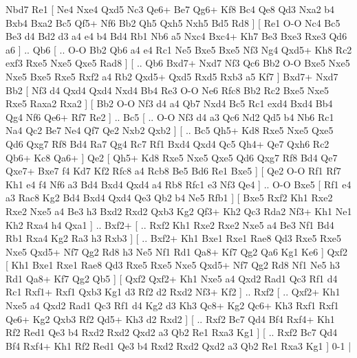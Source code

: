 Nbd7    Re1 [  Ne4 Nxe4  Qxd5 Nc3  Qe6+ Be7  Qg6+ Kf8  Bc4 Qe8  Qd3 Nxa2  b4 Bxb4  Bxa2 Bc5  Qf5+ Nf6  Bb2 Qh5  Qxh5 Nxh5  Bd5 Rd8   ]  [  Re1 O-O  Nc4 Bc5  Be3 d4  Bd2 d3  a4 e4  b4 Bd4  Rb1 Nb6  a5 Nxc4  Bxc4+ Kh7  Be3 Bxe3  Rxe3 Qd6  a6   ] .. Qb6 [ .. O-O  Bb2 Qb6  a4 e4  Rc1 Ne5  Bxe5 Bxe5  Nf3 Ng4  Qxd5+ Kh8  Rc2 exf3  Rxe5 Nxe5  Qxe5 Rad8   ]  [ .. Qb6  Bxd7+ Nxd7  Nf3 Qc6  Bb2 O-O  Bxe5 Nxe5  Nxe5 Bxe5  Rxe5 Rxf2  a4 Rb2  Qxd5+ Qxd5  Rxd5 Rxb3  a5 Kf7   ]  Bxd7+   Nxd7    Bb2 [  Nf3 d4  Qxd4 Qxd4  Nxd4 Bb4  Re3 O-O  Ne6 Rfc8  Bb2 Rc2  Bxe5 Nxe5  Rxe5 Raxa2  Rxa2   ]  [  Bb2 O-O  Nf3 d4  a4 Qb7  Nxd4 Bc5  Rc1 exd4  Bxd4 Bb4  Qg4 Nf6  Qe6+ Rf7  Re2   ] .. Bc5 [ .. O-O  Nf3 d4  a3 Qc6  Nd2 Qd5  b4 Nb6  Rc1 Na4  Qc2 Be7  Ne4 Qf7  Qe2 Nxb2  Qxb2   ]  [ .. Bc5  Qh5+ Kd8  Rxe5 Nxe5  Qxe5 Qd6  Qxg7 Rf8  Bd4 Ra7  Qg4 Rc7  Rf1 Bxd4  Qxd4 Qc5  Qh4+ Qe7  Qxh6 Rc2  Qb6+ Kc8  Qa6+   ]  Qe2 [  Qh5+ Kd8  Rxe5 Nxe5  Qxe5 Qd6  Qxg7 Rf8  Bd4 Qe7  Qxe7+ Bxe7  f4 Kd7  Kf2 Rfc8  a4 Rcb8  Be5 Bd6  Re1 Bxe5   ]  [  Qe2 O-O  Rf1 Rf7  Kh1 e4  f4 Nf6  a3 Bd4  Bxd4 Qxd4  a4 Rb8  Rfc1 e3  Nf3 Qe4   ] .. O-O    Bxe5 [  Rf1 e4  a3 Rac8  Kg2 Bd4  Bxd4 Qxd4  Qe3 Qb2  b4 Ne5  Rfb1   ]  [  Bxe5 Rxf2  Kh1 Rxe2  Rxe2 Nxe5  a4 Be3  h3 Bxd2  Rxd2 Qxb3  Kg2 Qf3+  Kh2 Qc3  Rda2 Nf3+  Kh1 Ne1  Kh2 Rxa4  h4 Qxa1   ] .. Bxf2+ [ .. Rxf2  Kh1 Rxe2  Rxe2 Nxe5  a4 Be3  Nf1 Bd4  Rb1 Rxa4  Kg2 Ra3  h3 Rxb3   ]  [ .. Bxf2+  Kh1 Bxe1  Rxe1 Rae8  Qd3 Rxe5  Rxe5 Nxe5  Qxd5+ Nf7  Qg2 Rd8  h3 Ne5  Nf1 Rd1  Qa8+ Kf7  Qg2 Qa6  Kg1 Ke6   ]  Qxf2 [  Kh1 Bxe1  Rxe1 Rae8  Qd3 Rxe5  Rxe5 Nxe5  Qxd5+ Nf7  Qg2 Rd8  Nf1 Ne5  h3 Rd1  Qa8+ Kf7  Qg2 Qb5   ]  [  Qxf2 Qxf2+  Kh1 Nxe5  a4 Qxd2  Rad1 Qc3  Rf1 d4  Rc1 Rxf1+  Rxf1 Qxb3  Kg1 d3  Rf2 d2  Rxd2 Nf3+  Kf2   ] .. Rxf2 [ .. Qxf2+  Kh1 Nxe5  a4 Qxd2  Rad1 Qc3  Rf1 d4  Kg2 d3  Kh3 Qc8+  Kg2 Qc6+  Kh3 Rxf1  Rxf1 Qe6+  Kg2 Qxb3  Rf2 Qd5+  Kh3 d2  Rxd2   ]  [ .. Rxf2  Bc7 Qd4  Bf4 Rxf4+  Kh1 Rf2  Red1 Qe3  b4 Rxd2  Rxd2 Qxd2  a3 Qb2  Re1 Rxa3  Kg1   ]  [ .. Rxf2  Bc7 Qd4  Bf4 Rxf4+  Kh1 Rf2  Red1 Qe3  b4 Rxd2  Rxd2 Qxd2  a3 Qb2  Re1 Rxa3  Kg1   ] 0-1  |
